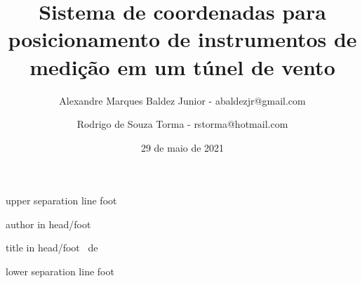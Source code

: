 \usepackage[utf8]{inputenc}
\usepackage{amsmath,amssymb}
\usepackage[brazil]{varioref}
\usepackage[english,brazil]{babel}
\usepackage{graphicx}
\usepackage{listings}
\usepackage{url}
\usepackage{colortbl}
\usepackage{setspace}
\usepackage{multimedia}



\beamertemplatetransparentcovereddynamic
\newcommand{\frameofframes}{/}
\newcommand{\setframeofframes}[1]{\renewcommand{\frameofframes}{#1}}
\setframeofframes{de}
\makeatletter
{}
  {%
    \begin{beamercolorbox}[colsep=1.5pt]{upper separation line foot}
    \end{beamercolorbox}
    \begin{beamercolorbox}[ht=2.5ex,dp=1.125ex,%
      leftskip=.3cm,rightskip=.3cm plus1fil]{author in head/foot}%
      \hfill%
      {\insertshortinstitute}%
    \end{beamercolorbox}%
    \begin{beamercolorbox}[ht=2.5ex,dp=1.125ex,%
      leftskip=.3cm,rightskip=.3cm plus1fil]{title in head/foot}%
      {\insertshorttitle}%
      \hfill%
      {\insertframenumber~\frameofframes~\inserttotalframenumber}
    \end{beamercolorbox}%
    \begin{beamercolorbox}[colsep=1.5pt]{lower separation line foot}
    \end{beamercolorbox}
  }
\makeatother
\title[Sistema de coordenadas para posicionamento de instrumentos de medição em um túnel de vento]
{\normalsize Sistema de coordenadas para posicionamento de instrumentos de medição em um túnel de vento}
\author[Baldez Jr, Torma]{Alexandre Marques Baldez Junior - abaldezjr@gmail.com \and Rodrigo de Souza Torma - rstorma@hotmail.com}

\date{29 de maio de 2021}

